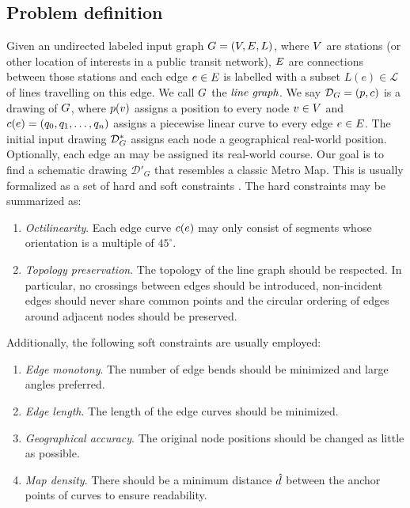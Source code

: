 \documentclass[sigconf]{acmart}
\begin{document}
\subsection{Problem definition}

Given an undirected labeled input graph $G = (V, E, L)$, where $V$ are stations (or other location of interests in a public transit network), $E$ are connections between those stations and each edge $e \in E$ is labelled with a subset $L(e) \in \mathcal{L}$ of lines travelling on this edge.
We call $G$ the $\emph{line graph}$.
We say $\mathcal{D}_{G} = (p, c)$ is a drawing of $G$, where $p(v)$ assigns a position to every node $v \in V$ and $c(e) = (q_0, q_1, \dots, q_n)$ assigns a piecewise linear curve to every edge $e \in E$.
The initial input drawing $\mathcal{D}_{G}^*$ assigns each node a geographical real-world position.
Optionally, each edge an may be assigned its real-world course.
Our goal is to find a schematic drawing $\mathcal{D}'_G$ that resembles a classic Metro Map.
This is usually formalized as a set of hard and soft constraints \cite{nb, ...}.
The hard constraints may be summarized as:
%
\begin{enumerate}
\setlength\itemsep{.1em}
\item \emph{Octilinearity}. Each edge curve $c(e)$ may only consist of segments whose orientation is a multiple of $45^{\circ}$.
\item \emph{Topology preservation}. The topology of the line graph should be respected. In particular, no crossings between edges should be introduced, non-incident edges should never share common points and the circular ordering of edges around adjacent nodes should be preserved.
\end{enumerate}
%
Additionally, the following soft constraints are usually employed:
%
\begin{enumerate}
\setlength\itemsep{.1em}
\item \emph{Edge monotony}. The number of edge bends should be minimized and large angles preferred.
\item \emph{Edge length}. The length of the edge curves should be minimized.
\item \emph{Geographical accuracy}. The original node positions should be changed as little as possible.
\item \emph{Map density}. There should be a minimum distance $\hat d$ between the anchor points of curves to ensure readability.
\end{enumerate}
\end{document}
